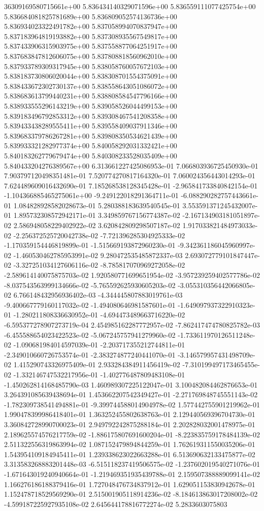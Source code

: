 36309169580715661e+00	5.836434140329071596e+00	5.836559111077425754e+00	5.836684081825781689e+00	5.836809052574136736e+00	5.836934023322491782e+00	5.837058994070837947e+00	5.837183964819193882e+00	5.837308935567549817e+00	5.837433906315903975e+00	5.837558877064251917e+00	5.837683847812606075e+00	5.837808818560962010e+00	5.837933789309317945e+00	5.838058760057672103e+00	5.838183730806020044e+00	5.838308701554375091e+00	5.838433672302730137e+00	5.838558643051086072e+00	5.838683613799440231e+00	5.838808584547796166e+00	5.838933555296143219e+00	5.839058526044499153e+00	5.839183496792853312e+00	5.839308467541208358e+00	5.839433438289555411e+00	5.839558409037911346e+00	5.839683379786267281e+00	5.839808350534621439e+00	5.839933321282977374e+00	5.840058292031332421e+00	5.840183262779679474e+00	5.840308233528035409e+00	5.840433204276389567e+00
6.313661227425086953e-01	7.066803936725450930e-01	7.903797120498351481e-01	7.520774270817164320e-01	7.060024356443014293e-01	7.624489609016432690e-01	7.185268538128345428e-01	-2.965841733840842154e-01	-1.104366885465275061e+00	-9.249122018291364711e-01	-6.088290282757443661e-01	1.084828928582028673e-01	5.280388183639540545e-01	3.553591371245432007e-01	1.895732308572942171e-01	3.349859767156774387e-02	-2.167134903181051897e-02	2.586948058229402922e-02	3.620842809298507187e-02	1.917033821484973033e-02	-2.256372525720042738e-02	-7.721396285304925333e-02	-1.170359154446819899e-01	-1.515669193872960230e-01	-9.342361186045960997e-02	-1.460530462785953991e-02	9.280472535485872337e-03	2.693072779101847447e-02	-3.327251034127606116e-02	-8.785817070969272058e-02	-2.589614140075875703e-02	1.920580771699651954e-02	-3.957239259402577786e-02	-8.037543563999134666e-02	-5.765592625930605203e-02	-3.055310356442066805e-02	6.766148432956936402e-03	-4.344445807883019761e-03	-9.400667779160117032e-02	-1.494080646981587601e-01	-1.649097937322910323e-01	-1.280211808336630952e-01	-4.694473489663716220e-02	-6.595377278907273719e-04	2.454985162287772957e-02	-7.862417474780825782e-03	-6.455588654023422523e-02	-5.067245757941279960e-02	-1.733611970126511248e-02	-1.090681984014597039e-01	-2.203717355212744811e-01	-2.349010660726753574e-01	-2.383274877240441070e-01	-3.146579957431498709e-02	1.415290743326975409e-01	2.933284384911456419e-02	-7.310199497173465455e-02	-1.332146747532217956e-01	-1.402776487809483108e-01	-1.450262814168485790e-03	1.460989307225122047e-01	3.100482084462876653e-01	3.264391085639438694e-01	1.453662207542349427e-01	-2.271769848745551143e-02	-1.782309738541494881e-01	-9.399744588014904978e-02	1.577442755901219962e-01	1.990478399986418401e-01	1.363252455802638763e-01	2.129440569396704730e-01	3.360842728990700023e-01	2.949792242875288184e-01	2.202828032001478975e-01	2.189625574576217759e-02	-1.886175807691600204e-01	-8.223835759178484139e-02	2.511322556319863994e-02	1.087152479894844259e-01	1.762619311550035206e-01	1.543954109184945411e-01	1.239338623022663288e-01	6.513690632133475877e-02	3.313583268883201448e-03	-6.515118237419506575e-02	-1.237602019540271076e-01	-1.671643019240940664e-01	-1.219469351935439788e-01	2.159507388889099141e-02	1.166276186188379416e-01	1.727048476734837912e-01	1.629051153830942678e-01	1.152478718529569290e-01	2.515001905118914236e-02	-8.184613863017208002e-02	-4.599187225927935108e-02	2.645644178816772274e-02	5.2833603075803